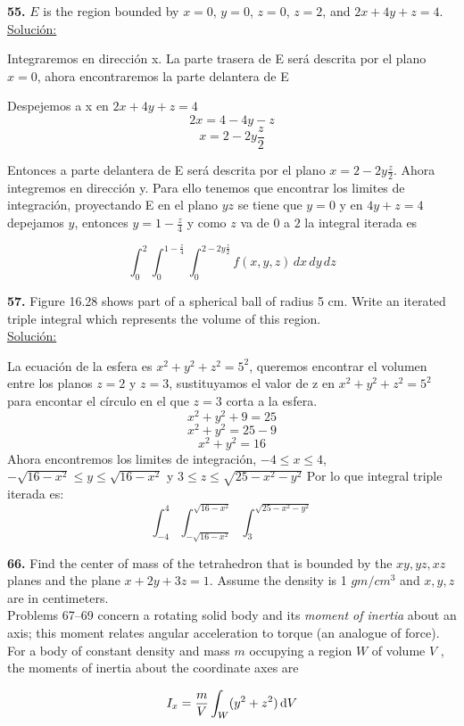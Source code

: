 \documentclass[11pt]{report}
\newcommand{\s}{\underline{Soluci\'{o}n:}}
\begin{document}
\textbf{55.} $E$ is the region bounded by $x = 0$, $y = 0$, $z = 0$, $z = 2$,
and $2x + 4y + z = 4$. \\
\s

Integraremos en direcci\'{o}n x. La parte trasera de E ser\'{a} descrita por
el plano $x = 0$, ahora encontraremos la parte delantera de E

Despejemos a x en $2x + 4y + z = 4$
\[2x = 4 - 4y - z\]
\[x = 2 - 2y \frac{z}{2}\]

Entonces a parte delantera de E ser\'{a} descrita por el plano $x = 2 - 2y \frac{z}{2}$.
Ahora integremos en direcci\'{o}n y. Para ello tenemos que encontrar los
limites de integraci\'{o}n, proyectando E en el plano $yz$ se tiene que
$y = 0$ y en $4y + z = 4$ depejamos $y$, entonces
$y = 1 - \frac{z}{4}$ y como $z$ va de $0$ a $2$ la integral iterada es

\[\int^{2}_{0}\int^{1 - \frac{z}{4}}_{0}\int^{2 - 2y \frac{z}{2}}_{0}  f(x, y, z) \, dx \, dy \, dz\]

\textbf{57.} Figure 16.28 shows part of a spherical ball of radius 5 cm.
Write an iterated triple integral which represents the volume of this region. \\
\s

La ecuaci\'{o}n de la esfera es $x^2 + y^2 + z^2 = 5^2$, queremos encontrar el
volumen entre los planos $z = 2$ y $z = 3$, sustituyamos el valor de z en
$x^2 + y^2 + z^2 = 5^2$ para encontar el c\'{i}rculo en el que $z = 3$ corta a la
esfera.
\[x^2 + y^2 + 9 = 25 \]
\[x^2 + y^2 = 25 - 9\]
\[x^2 + y^2 = 16 \]
Ahora encontremos los limites de integraci\'{o}n, $-4 \leq x \leq 4$,
$-\sqrt{16 - x^2} \leq y \leq \sqrt{16 - x^2}$ y $3 \leq z \leq \sqrt{25 - x^2 - y^2}$
Por lo que integral triple iterada es:
\[\int^{4}_{-4}\int^{\sqrt{16 - x^2}}_{-\sqrt{16 - x^2}}\int^{\sqrt{25 - x^2 - y^2}}_{3}\]

\textbf{66.} Find the center of mass of the tetrahedron that is bounded by the
$xy, yz, xz$ planes and the plane $x + 2y + 3z = 1$. Assume the density is
1 $gm/cm^3$ and $x, y, z$ are in centimeters. \\

Problems 67–69 concern a rotating solid body and its \textit{moment of inertia}
about an axis; this moment relates angular acceleration to torque (an analogue
of force). For a body of constant density and mass $m$ occupying a region $W$
of volume $V$ , the moments of inertia about the coordinate axes are

\[I_x = \frac{m}{V} \int _W (y^2 + z^2) \, \text d V \]
\end{document}
